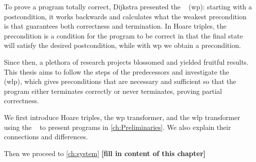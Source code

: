To prove a program totally correct, Dijkstra presented the ~\cite{dijkstra75} (wp): starting with a postcondition, it works backwards and calculates what the weakest precondition is that guarantees both correctness and termination. 
In Hoare triples, the precondition is a  condition for the program to be correct in that the final state will satisfy the desired postcondition, while with wp we obtain a  precondition. 

Since then, a plethora of research projects blossomed and yielded fruitful results. 
This thesis aims to follow the steps of the predecessors and investigate the ~\cite{dijkstra90} (wlp), which gives preconditions that are necessary and sufficient so that the program either terminates correctly or never terminates, proving partial correctness. 

We first introduce Hoare triples, the wp transformer, and the wlp transformer using the ~\cite{dijkstra75} to present programs in \autoref{ch:Preliminaries}. 
We also explain their connections and differences. 

Then we proceed to \autoref{ch:system} \textbf{[fill in content of this chapter]} %








